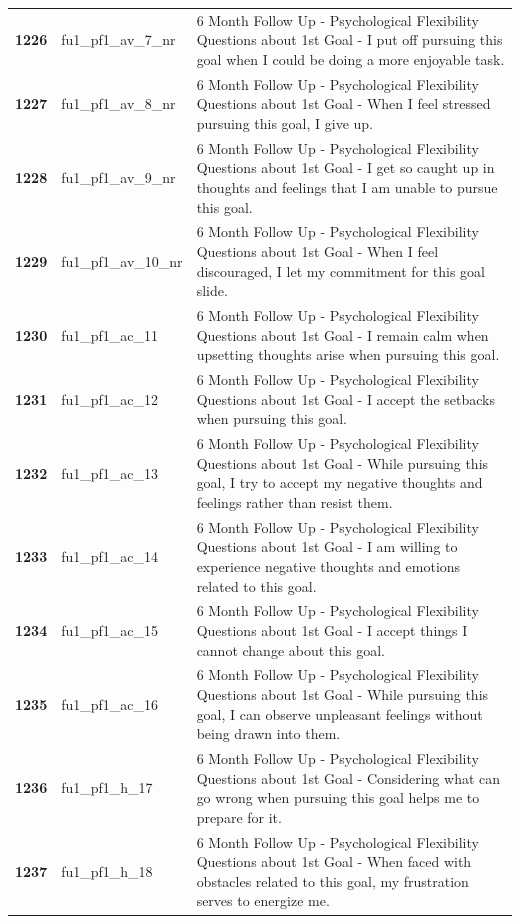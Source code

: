 \documentclass[
  letterpaper,
  DIV=11,
  numbers=noendperiod]{scrartcl}
\begin{document}
\begin{longtable}[t]{>{}cll}
\addlinespace
\textbf{1226} & fu1\_pf1\_av\_7\_nr & 6 Month Follow Up - Psychological Flexibility Questions about 1st Goal - I put off pursuing this goal when I could be doing a more enjoyable task.\\
\textbf{1227} & fu1\_pf1\_av\_8\_nr & 6 Month Follow Up - Psychological Flexibility Questions about 1st Goal - When I feel stressed pursuing this goal, I give up.\\
\textbf{1228} & fu1\_pf1\_av\_9\_nr & 6 Month Follow Up - Psychological Flexibility Questions about 1st Goal - I get so caught up in thoughts and feelings that I am unable to pursue this goal.\\
\textbf{1229} & fu1\_pf1\_av\_10\_nr & 6 Month Follow Up - Psychological Flexibility Questions about 1st Goal - When I feel discouraged, I let my commitment for this goal slide.\\
\textbf{1230} & fu1\_pf1\_ac\_11 & 6 Month Follow Up - Psychological Flexibility Questions about 1st Goal - I remain calm when upsetting thoughts arise when pursuing this goal.\\
\addlinespace
\textbf{1231} & fu1\_pf1\_ac\_12 & 6 Month Follow Up - Psychological Flexibility Questions about 1st Goal - I accept the setbacks when pursuing this goal.\\
\textbf{1232} & fu1\_pf1\_ac\_13 & 6 Month Follow Up - Psychological Flexibility Questions about 1st Goal - While pursuing this goal, I try to accept my negative thoughts and feelings rather than resist them.\\
\textbf{1233} & fu1\_pf1\_ac\_14 & 6 Month Follow Up - Psychological Flexibility Questions about 1st Goal - I am willing to experience negative thoughts and emotions related to this goal.\\
\textbf{1234} & fu1\_pf1\_ac\_15 & 6 Month Follow Up - Psychological Flexibility Questions about 1st Goal - I accept things I cannot change about this goal.\\
\textbf{1235} & fu1\_pf1\_ac\_16 & 6 Month Follow Up - Psychological Flexibility Questions about 1st Goal - While pursuing this goal, I can observe unpleasant feelings without being drawn into them.\\
\addlinespace
\textbf{1236} & fu1\_pf1\_h\_17 & 6 Month Follow Up - Psychological Flexibility Questions about 1st Goal - Considering what can go wrong when pursuing this goal helps me to prepare for it.\\
\textbf{1237} & fu1\_pf1\_h\_18 & 6 Month Follow Up - Psychological Flexibility Questions about 1st Goal - When faced with obstacles related to this goal, my frustration serves to energize me.\\

\end{longtable}
\end{document}
